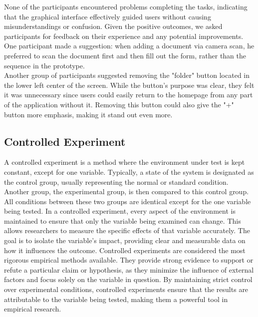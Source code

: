 	\noindent
	None of the participants encountered problems completing the tasks, indicating that the graphical interface effectively guided users without causing misunderstandings or confusion.
	\clearpage
	\noindent
	Given the positive outcomes, we asked participants for feedback on their experience and any potential improvements. One participant made a suggestion: when adding a document via camera scan, he preferred to scan the document first and then fill out the form, rather than the sequence in the prototype.\\
	Another group of participants suggested removing the "folder" button located in the lower left center of the screen. While the button's purpose was clear, they felt it was unnecessary since users could easily return to the homepage from any part of the application without it. Removing this button could also give the "+" button more emphasis, making it stand out even more.	
	
	
	
	
	
	
	
	\subsection{Controlled Experiment}
	A controlled experiment is a method where the environment under test is kept constant, except for one variable. Typically, a state of the system is designated as the control group, usually representing the normal or standard condition. Another group, the experimental group, is then compared to this control group. All conditions between these two groups are identical except for the one variable being tested.\newline
	In a controlled experiment, every aspect of the environment is maintained to ensure that only the variable being examined can change. This allows researchers to measure the specific effects of that variable accurately. The goal is to isolate the variable's impact, providing clear and measurable data on how it influences the outcome.\newline
	Controlled experiments are considered the most rigorous empirical methods available. They provide strong evidence to support or refute a particular claim or hypothesis, as they minimize the influence of external factors and focus solely on the variable in question. By maintaining strict control over experimental conditions, controlled experiments ensure that the results are attributable to the variable being tested, making them a powerful tool in empirical research.
